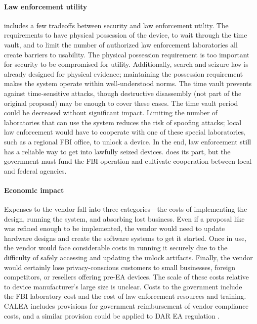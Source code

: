 \paragraph*{Law enforcement utility} \ldawmsr includes a few tradeoffs between security and law enforcement utility. The
requirements to have physical possession of the device, to wait through the time vault, and to limit the number of
authorized law enforcement laboratories all create barriers to usability. The physical possession requirement is too
important for security to be compromised for utility. Additionally, search and seizure law is already designed for
physical evidence; maintaining the possession requirement makes the system operate within well-understood norms. The
time vault prevents against time-sensitive attacks, though destructive disassembly (not part of the original proposal)
may be enough to cover these cases. The time vault period could be decreased without significant impact. Limiting the
number of laboratories that can use the system reduces the risk of spoofing attacks; local law enforcement would have to
cooperate with one of these special laboratories, such as a regional \ac{FBI} office, to unlock a device. In the end,
law enforcement still has a reliable way to get into lawfully seized devices. \ldawmsr does its part, but the government
must fund the \ac{FBI} operation and cultivate cooperation between local and federal agencies.

\paragraph*{Economic impact} Expenses to the vendor fall into three categories---the costs of implementing the design,
running the system, and absorbing lost business. Even if a proposal like \ldawmsr was refined enough to be implemented,
the vendor would need to update hardware designs and create the software systems to get it started. Once in use, the
vendor would face considerable costs in running it securely due to the difficulty of safely accessing and updating the
unlock artifacts. Finally, the vendor would certainly lose privacy-conscious customers to small businesses, foreign
competitors, or resellers offering pre-\ac{EA} devices. The scale of these costs relative to device manufacturer's large
size is unclear. Costs to the government include the \ac{FBI} laboratory cost and the cost of law enforcement resources
and training. \acs{CALEA} includes provisions for government reimbursement of vendor compliance costs, and a similar
provision could be applied to \ac{DAR} \ac{EA} regulation \cite{edwards_hr4922_1994}.
